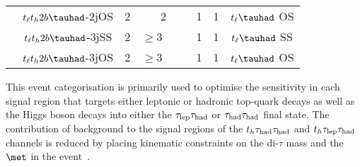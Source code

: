 \begin{table}
\begin{center}
\begin{tabular}[h]{c|c|c|c|c|c|c}
&$t_{\ell}t_h2b\tauhad$-2jOS & 2     & 2                             & 1      & 1             & $t_{\ell}\tauhad$ OS\\ \cline{2-7}
&$t_{\ell}t_h2b\tauhad$-3jSS & 2     & $\ge3$~~~~                        & 1      & 1             & $t_{\ell}\tauhad$ SS\\ \cline{2-7}
&$t_{\ell}t_h2b\tauhad$-3jOS & 2     & $\ge3$~~~~                & 1      & 1             & $t_{\ell}\tauhad$ OS\\ \hline
\end{tabular}
\end{center}
\end{table}







This event categorisation is primarily used to optimise the sensitivity in each signal region that targets either leptonic or hadronic top-quark
decays as well as the Higgs boson decays into either the $\tau_{\mathrm{lep}} \tau_{\mathrm{had}}$ or $\tau_{\mathrm{had}} \tau_{\mathrm{had}}$ final state.   
The contribution of background to the signal regions of the $t_h\tau_{\mathrm{had}} \tau_{\mathrm{had}}$ and $t_h\tau_{\mathrm{lep}} \tau_{\mathrm{had}}$ channels is reduced by placing kinematic constraints on the di-$\tau$ mass and the $\met$ in the event~\cite{Chen:2015nta}.



